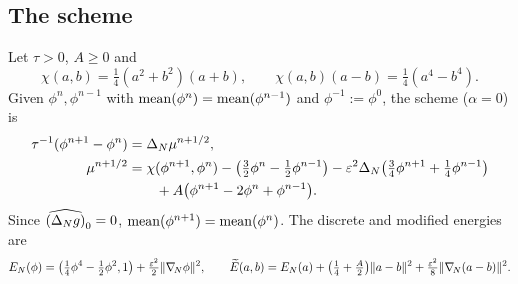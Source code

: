 \subsection{The scheme}
Let $\tau>0$, $A\ge0$ and
\begin{equation}\label{eq:chi}
\chi(a,b)=\tfrac14(a^2+b^2)(a+b),\qquad \chi(a,b)(a-b)=\tfrac14(a^4-b^4).
\end{equation}
Given $\phi^n,\phi^{n-1}$ with $\operatorname{mean}(\phi^n)=\operatorname{mean}(\phi^{n-1})$ and $\phi^{-1}:=\phi^0$, the scheme \cite{ChengWangWiseYue2016} ($\alpha=0$) is
\begin{subequations}\label{eq:scheme}
\begin{align}
\tau^{-1}(\phi^{n+1}-\phi^n)&=\Delta_N\mu^{n+1/2},\\
\mu^{n+1/2}&=\chi(\phi^{n+1},\phi^n)-\big(\tfrac32\phi^n-\tfrac12\phi^{n-1}\big)-\varepsilon^2\Delta_N\big(\tfrac34\phi^{n+1}+\tfrac14\phi^{n-1}\big)\notag\\
&\qquad+A\big(\phi^{n+1}-2\phi^n+\phi^{n-1}\big).
\end{align}
\end{subequations}
Since $\widehat{(\Delta_N g)}_0=0$, $\operatorname{mean}(\phi^{n+1})=\operatorname{mean}(\phi^n)$. The discrete and modified energies are
\begin{equation}\label{eq:modE}
E_N(\phi)=\big(\tfrac14\phi^4-\tfrac12\phi^2,1\big)+\tfrac{\varepsilon^2}{2}\lVert \nabla_{\!N}\phi\rVert^2,\qquad
\widetilde{E}(a,b)=E_N(a)+\big(\tfrac14+\tfrac A2\big)\lVert a-b\rVert^2+\tfrac{\varepsilon^2}{8}\lVert \nabla_{\!N}(a-b)\rVert^2 .
\end{equation}

